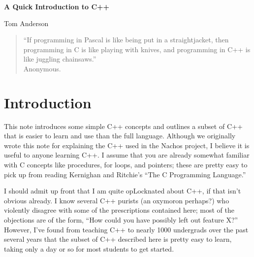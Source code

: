 
\newcommand{\putfig}[3]%
{\begin{figure}%
\centerline{%
\psfig{figure=#1.ps,width=#3}}%
\caption{#2}%
\label{fig:#1}%
\end{figure}}





\begin{figure*}[t]
\begin{center}
{\LARGE\bf A Quick Introduction to C++}

\vspace{3.0ex}

{\Large Tom Anderson}
\end{center}
\end{figure*}

\renewcommand{\thefootnote}{\fnsymbol{footnote}}


\renewcommand{\thefootnote}{}
\renewcommand{\thefootnote}{\arabic{footnote}}

\begin{quote}
``If programming in Pascal is like being put in a straightjacket,
then programming in C is like playing with knives, and programming
in C++ is like juggling chainsaws.'' \\ \hbox{} \hfill Anonymous.
\end{quote}

\section{Introduction}

This note introduces some simple C++ concepts and outlines a
subset of C++ that is easier to learn and use than
the full language.  Although we originally wrote this note for
explaining the C++ used in the Nachos project, I believe it is 
useful to anyone learning C++.
I assume that you are already somewhat familiar with C concepts
like procedures, for loops, and pointers; these are pretty easy
to pick up from reading Kernighan and Ritchie's ``The C Programming 
Language.''

I should admit up front that I am quite opLocknated about C++, if
that isn't obvious already.
I know several C++ purists (an oxymoron perhaps?) who violently
disagree with some of
the prescriptions contained here; most of the objections are of
the form, ``How could you have possibly left out feature X?''
However, I've found from teaching C++ to nearly 1000 undergrads
over the past several years that the subset of C++ described here is
pretty easy to learn, taking only a day or so for most students 
to get started.

